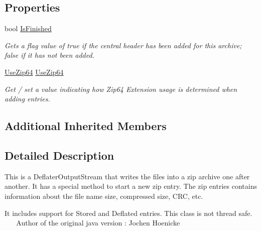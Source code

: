 \subsection*{Properties}
\begin{DoxyCompactItemize}
\item 
bool \hyperlink{class_i_c_sharp_code_1_1_sharp_zip_lib_1_1_zip_1_1_zip_output_stream_a2390775f9b8e41b277fc88c517e09ef0}{Is\+Finished}
\begin{DoxyCompactList}\small\item\em Gets a flag value of true if the central header has been added for this archive; false if it has not been added. \end{DoxyCompactList}\item 
\hyperlink{namespace_i_c_sharp_code_1_1_sharp_zip_lib_1_1_zip_aaa66f18625e7ce19069972caf7bc69a0}{Use\+Zip64} \hyperlink{class_i_c_sharp_code_1_1_sharp_zip_lib_1_1_zip_1_1_zip_output_stream_acf7213e45d7ef52f3422d07a9e67a9c3}{Use\+Zip64}
\begin{DoxyCompactList}\small\item\em Get / set a value indicating how Zip64 Extension usage is determined when adding entries. \end{DoxyCompactList}\end{DoxyCompactItemize}
\subsection*{Additional Inherited Members}


\subsection{Detailed Description}
This is a Deflater\+Output\+Stream that writes the files into a zip archive one after another. It has a special method to start a new zip entry. The zip entries contains information about the file name size, compressed size, C\+RC, etc. 

It includes support for Stored and Deflated entries. This class is not thread safe. ~\newline
 ~\newline
Author of the original java version \+: Jochen Hoenicke 

